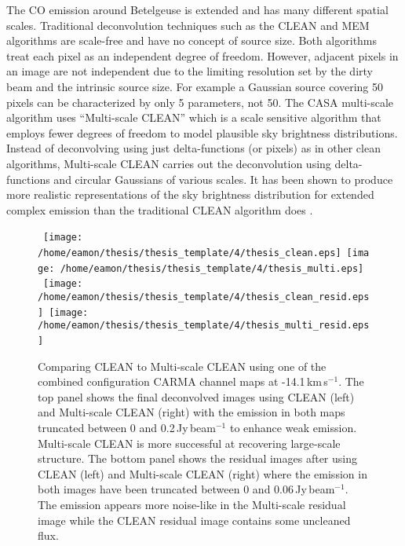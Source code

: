 The CO emission around Betelgeuse is extended and has many different spatial scales. Traditional deconvolution techniques such as the CLEAN and MEM algorithms are scale-free and have no concept of source size. Both algorithms treat each pixel as an independent degree of freedom. However, adjacent pixels in an image are not independent due to the limiting resolution set by the dirty beam and the intrinsic source size. For example a Gaussian source covering 50 pixels can be characterized by only 5 parameters, not 50. The CASA multi-scale algorithm uses ``Multi-scale CLEAN'' \citep{cornwell_2008} which is a scale sensitive algorithm that employs fewer degrees of freedom to model plausible sky brightness distributions. Instead of deconvolving using just delta-functions (or pixels) as in other clean algorithms, Multi-scale CLEAN carries out the deconvolution using delta-functions and circular Gaussians of various scales. It has been shown to produce more realistic representations of the sky brightness distribution for extended complex emission than the traditional CLEAN algorithm does \citep{rich_2008}.

\begin{figure}[hbt!]
\centering 
\mbox{
\texttt{[image: /home/eamon/thesis/thesis\_template/4/thesis\_clean.eps]}  
\texttt{[image: /home/eamon/thesis/thesis\_template/4/thesis\_multi.eps]}  
}
\mbox{
\texttt{[image: /home/eamon/thesis/thesis\_template/4/thesis\_clean\_resid.eps]}  
\texttt{[image: /home/eamon/thesis/thesis\_template/4/thesis\_multi\_resid.eps]}  
}
\caption[Comparing CLEAN to Multi-scale CLEAN.]{Comparing CLEAN to Multi-scale CLEAN using one of the combined configuration CARMA channel maps at -14.1\,km\,s$^{-1}$. The top panel shows the final deconvolved images using CLEAN (left) and Multi-scale CLEAN (right) with the emission in both maps truncated between 0 and 0.2\,Jy\,beam$^{-1}$ to enhance weak emission. Multi-scale CLEAN is more successful at recovering large-scale structure. The bottom panel shows the residual images after using CLEAN (left) and Multi-scale CLEAN (right) where the emission in both images have been truncated between 0 and 0.06\,Jy\,beam$^{-1}$. The emission appears more noise-like in the Multi-scale residual image while the CLEAN residual image contains some uncleaned flux.}
\label{fig:4.7}
\end{figure}

